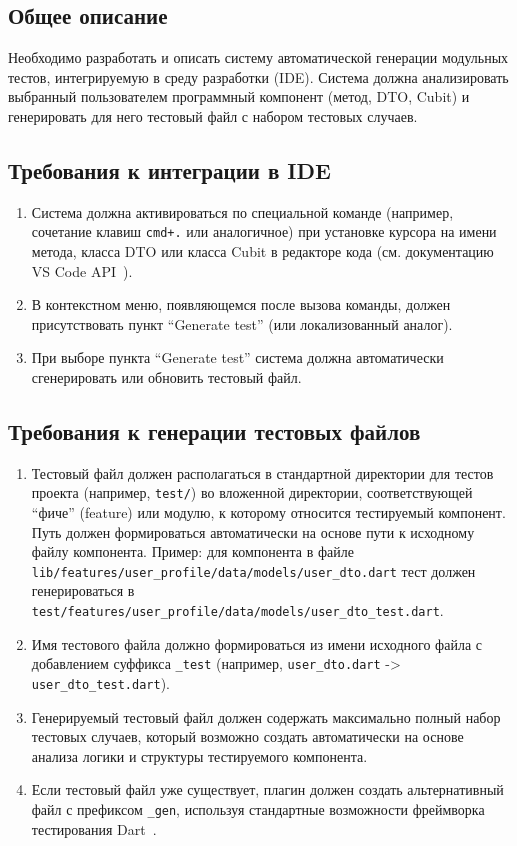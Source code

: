 \documentclass[14pt, russian]{scrartcl}
\newcommand{\enq}[1]{\enquote{#1}}
\begin{document}
\subsection{Общее описание}

Необходимо разработать и описать систему автоматической генерации модульных тестов, интегрируемую в среду разработки (IDE). Система должна анализировать выбранный пользователем программный компонент (метод, DTO, Cubit) и генерировать для него тестовый файл с набором тестовых случаев.

\subsection{Требования к интеграции в IDE}

\begin{enumerate}
    \item Система должна активироваться по специальной команде (например, сочетание клавиш \texttt{cmd+.} или аналогичное) при установке курсора на имени метода, класса DTO или класса Cubit в редакторе кода (см. документацию VS Code API~\cite{VSCodeAPI}).
    \item В контекстном меню, появляющемся после вызова команды, должен присутствовать пункт \enq{Generate test} (или локализованный аналог).
    \item При выборе пункта \enq{Generate test} система должна автоматически сгенерировать или обновить тестовый файл.
\end{enumerate}

\subsection{Требования к генерации тестовых файлов}

\begin{enumerate}
    \item Тестовый файл должен располагаться в стандартной директории для тестов проекта (например, \texttt{test/}) во вложенной директории, соответствующей \enq{фиче} (feature) или модулю, к которому относится тестируемый компонент. Путь должен формироваться автоматически на основе пути к исходному файлу компонента. Пример: для компонента в файле \texttt{lib/features/user\_profile/data/models/user\_dto.dart} тест должен генерироваться в \\ \texttt{test/features/user\_profile/data/models/user\_dto\_test.dart}.
    \item Имя тестового файла должно формироваться из имени исходного файла с добавлением суффикса \texttt{\_test} (например, \texttt{user\_dto.dart} -> \texttt{user\_dto\_test.dart}).
    \item Генерируемый тестовый файл должен содержать максимально полный набор тестовых случаев, который возможно создать автоматически на основе анализа логики и структуры тестируемого компонента.
    \item Если тестовый файл уже существует, плагин должен создать альтернативный файл с префиксом \texttt{\_gen}, используя стандартные возможности фреймворка тестирования Dart~\cite{DartTestPackage}.
\end{enumerate}
\end{document}
